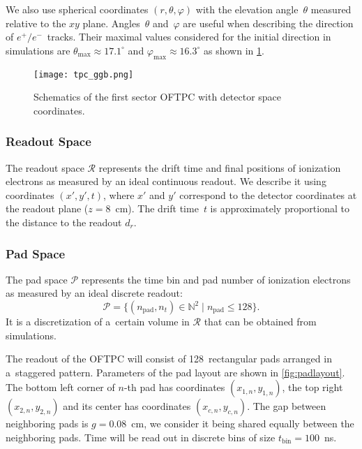 				We also use spherical coordinates $(r,\theta,\varphi)$ with the elevation angle~$\theta$ measured relative to the $xy$ plane. Angles~$\theta$ and~$\varphi$ are useful when describing the direction of $e^+/e^-$~tracks. Their maximal values considered for the initial direction in simulations are $\theta_\text{max} \approx 17.1^\circ$ and $\varphi_\text{max} \approx 16.3^\circ$ as shown in \cref{fig:oftpc}.
				
				\begin{figure}
					\centering
					\texttt{[image: tpc\_ggb.png]}
					\caption{Schematics of the first sector \ac{OFTPC} with detector space coordinates.}
					\label{fig:oftpc}
				\end{figure}
			
			\subsubsection{Readout Space}
				The readout space $\mathcal{R}$ represents the drift time and final positions of ionization electrons as measured by an ideal continuous readout. We describe it using coordinates $(x',y',t)$, where $x'$ and $y'$ correspond to the detector coordinates at the readout plane ($z = 8$~cm). The drift time~$t$ is approximately proportional to the distance to the readout $d_r$.
			
			\subsubsection{Pad Space}
				The pad space $\mathcal{P}$ represents the time bin and pad number of ionization electrons as measured by an ideal discrete readout:
					\begin{equation}
						\mathcal{P} = \{(n_\text{pad},n_t)\in\mathbb{N}^2 \mid n_\text{pad}\leq128\}.
					\end{equation}
				It is a discretization of a~certain volume in $\mathcal{R}$ that can be obtained from simulations.
				
				The readout of the \ac{OFTPC} will consist of 128~rectangular pads arranged in a~staggered pattern. Parameters of the pad layout are shown in \cref{fig:padlayout}. The bottom left corner of $n$\nobreakdash-th pad has coordinates $(x_{1,n},y_{1,n})$, the  top right $(x_{2,n},y_{2,n})$ and its center has coordinates $(x_{c,n},y_{c,n})$. The gap between neighboring pads is $g=0.08$~cm, we consider it being shared equally between the neighboring pads. Time will be read out in discrete bins of size $t_\text{bin}=100$~ns.
			
